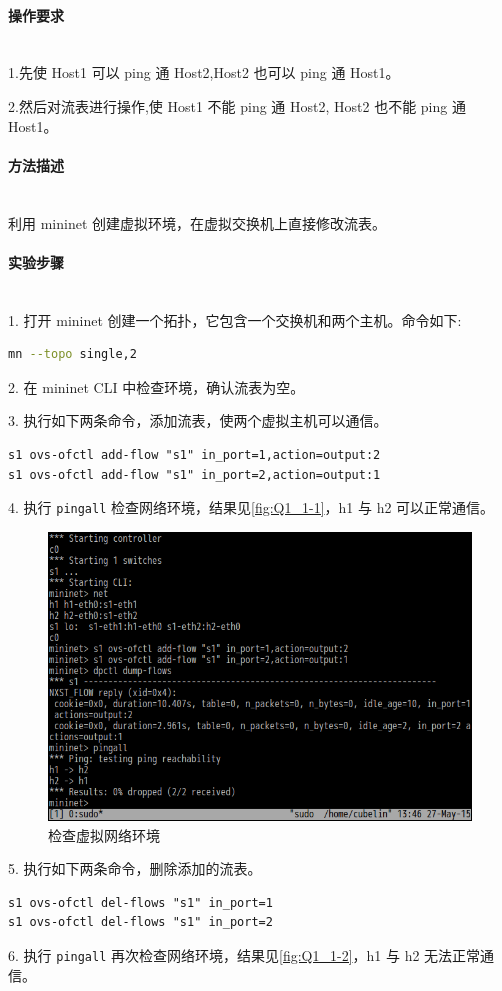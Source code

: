 \documentclass[format=draft,language=chinese,category=SDN]{hustreport}
\newcommand{\myparagraph}[1]{\paragraph{#1}\mbox{}\\}
\newcommand{\code}{\texttt}
\begin{document}
\myparagraph{操作要求}

1.先使 Host1 可以 ping 通 Host2,Host2 也可以 ping 通 Host1。

2.然后对流表进行操作,使 Host1 不能 ping 通 Host2, Host2 也不能 ping 通 Host1。

\myparagraph{方法描述}

利用 mininet 创建虚拟环境，在虚拟交换机上直接修改流表。

\myparagraph{实验步骤}

1. 打开 mininet 创建一个拓扑，它包含一个交换机和两个主机。命令如下:

\begin{lstlisting}[language=bash]
mn --topo single,2
\end{lstlisting}

2. 在 mininet CLI 中检查环境，确认流表为空。

3. 执行如下两条命令，添加流表，使两个虚拟主机可以通信。

\begin{lstlisting}
s1 ovs-ofctl add-flow "s1" in_port=1,action=output:2
s1 ovs-ofctl add-flow "s1" in_port=2,action=output:1
\end{lstlisting}

4. 执行 \code{pingall} 检查网络环境，结果见\autoref{fig:Q1_1-1}，h1 与 h2 可以正常通信。

\begin{figure}[!h]
\centering
\includegraphics[width=.618\textwidth]{fig/1_1-1.png}
\caption{检查虚拟网络环境}\label{fig:Q1_1-1}
\end{figure}

5. 执行如下两条命令，删除添加的流表。

\begin{lstlisting}
s1 ovs-ofctl del-flows "s1" in_port=1
s1 ovs-ofctl del-flows "s1" in_port=2
\end{lstlisting}

6. 执行 \code{pingall} 再次检查网络环境，结果见\autoref{fig:Q1_1-2}，h1 与 h2 无法正常通信。
\end{document}
